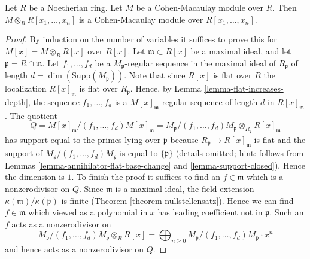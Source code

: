 \begin{lemma}
\label{lemma-maximal-CM-polynomial-algebra}
Let $R$ be a Noetherian ring. Let $M$ be a Cohen-Macaulay module
over $R$. Then $M \otimes_R R[x_1, \ldots, x_n]$ is a
Cohen-Macaulay module over $R[x_1, \ldots, x_n]$.
\end{lemma}

\begin{proof}
By induction on the number of variables it suffices to prove this for
$M[x] = M \otimes_R R[x]$ over $R[x]$. Let $\mathfrak m \subset R[x]$
be a maximal ideal, and let $\mathfrak p = R \cap \mathfrak m$.
Let $f_1, \ldots, f_d$ be a $M_\mathfrak p$-regular sequence in the maximal
ideal of $R_{\mathfrak p}$ of length $d = \dim(\text{Supp}(M_{\mathfrak p}))$.
Note that since $R[x]$ is flat over $R$ the localization
$R[x]_{\mathfrak m}$ is flat over $R_{\mathfrak p}$.
Hence, by Lemma \ref{lemma-flat-increases-depth}, the sequence
$f_1, \ldots, f_d$ is a $M[x]_{\mathfrak m}$-regular sequence of length $d$
in $R[x]_{\mathfrak m}$. The quotient
$$
Q = M[x]_{\mathfrak m}/(f_1, \ldots, f_d)M[x]_{\mathfrak m} =
M_{\mathfrak p}/(f_1, \ldots, f_d)M_{\mathfrak p}
\otimes_{R_\mathfrak p} R[x]_{\mathfrak m}
$$
has support equal to the primes lying over $\mathfrak p$
because $R_\mathfrak p \to R[x]_\mathfrak m$ is flat and
the support of $M_{\mathfrak p}/(f_1, \ldots, f_d)M_{\mathfrak p}$
is equal to $\{\mathfrak p\}$ (details omitted; hint: follows from
Lemmas \ref{lemma-annihilator-flat-base-change} and
\ref{lemma-support-closed}). Hence the dimension is $1$.
To finish the proof it suffices to find an $f \in \mathfrak m$
which is a nonzerodivisor on $Q$. Since $\mathfrak m$ is
a maximal ideal, the field extension
$\kappa(\mathfrak m)/\kappa(\mathfrak p)$
is finite (Theorem \ref{theorem-nullstellensatz}).
Hence we can find $f \in \mathfrak m$ which
viewed as a polynomial in $x$ has leading
coefficient not in $\mathfrak p$. Such an $f$ acts as
a nonzerodivisor on
$$
M_{\mathfrak p}/(f_1, \ldots, f_d)M_{\mathfrak p} \otimes_R R[x] =
\bigoplus\nolimits_{n \geq 0}
M_{\mathfrak p}/(f_1, \ldots, f_d)M_{\mathfrak p} \cdot x^n
$$
and hence acts as a nonzerodivisor on $Q$.
\end{proof}















